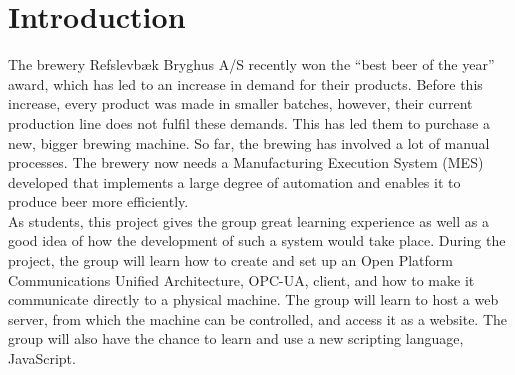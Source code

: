 \section{Introduction}
The brewery Refslevbæk Bryghus A/S recently won the “best beer of the year” 
award, which has led to an increase in demand for their products. Before this
increase, every product was made in smaller batches, however, their current
production line does not fulfil these demands. This has led them to purchase a
new, bigger brewing machine. So far, the brewing has involved a lot of manual
processes. The brewery now needs a Manufacturing Execution System (MES)
developed that implements a large degree of automation and enables it to produce
beer more efficiently.\\

As students, this project gives the group great learning experience as
well as a good idea of how the development of such a system would take place. 
During the project, the group will learn how to create and set up an Open
Platform Communications Unified Architecture, OPC-UA, client, and how to make it
communicate directly to a physical machine. The group will learn to host a web
server, from which the machine can be controlled, and access it as a website.
The group will also have the chance to learn and use a new scripting language,
JavaScript.

